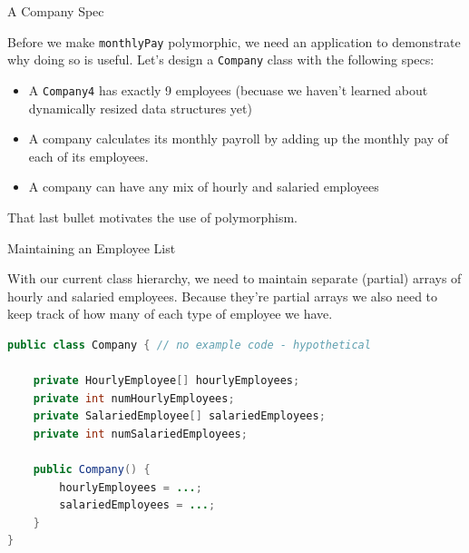 \documentclass{beamer}
\begin{document}
\begin{frame}[fragile]{A Company Spec}


Before we make {\tt monthlyPay} polymorphic, we need an application to demonstrate why doing so is useful.  Let's design a {\tt Company} class with the following specs:

\begin{itemize}
\item A {\tt Company4} has exactly 9 employees (becuase we haven't learned about dynamically resized data structures yet)
\item A company calculates its monthly payroll by adding up the monthly pay of each of its employees.
\item A company can have any mix of hourly and salaried employees
\end{itemize}

That last bullet motivates the use of polymorphism.

\end{frame}

\begin{frame}[fragile]{Maintaining an Employee List}


With our current class hierarchy, we need to maintain separate (partial) arrays of hourly and salaried employees.  Because they're partial arrays we also need to keep track of how many of each type of employee we have.
\begin{lstlisting}[language=Java]
public class Company { // no example code - hypothetical

    private HourlyEmployee[] hourlyEmployees;
    private int numHourlyEmployees;
    private SalariedEmployee[] salariedEmployees;
    private int numSalariedEmployees;

    public Company() {
        hourlyEmployees = ...;
        salariedEmployees = ...;
    }
}
\end{lstlisting}


\end{frame}
\end{document}
